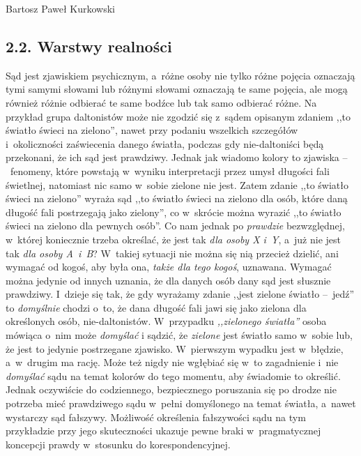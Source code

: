 \begin{artplenv}{Bartosz Paweł Kurkowski}
\subsection{2.2. Warstwy realności}

Sąd jest zjawiskiem psychicznym, a~różne osoby nie tylko różne pojęcia oznaczają tymi samymi słowami lub różnymi słowami
oznaczają te same pojęcia, ale mogą również różnie odbierać te same bodźce lub tak samo odbierać różne. Na przykład
grupa daltonistów może nie zgodzić się z~sądem opisanym zdaniem ,,to światło świeci na zielono'', nawet przy podaniu
wszelkich szczegółów i~okoliczności zaświecenia danego światła, podczas gdy nie-daltoniści będą przekonani, że ich sąd
jest prawdziwy. Jednak jak wiadomo kolory to zjawiska --~fenomeny, które powstają w~wyniku interpretacji przez umysł
długości fali świetlnej, natomiast nic samo w~sobie zielone nie jest. Zatem zdanie ,,to światło świeci na zielono''
wyraża sąd ,,to światło świeci na zielono dla osób, które daną długość fali postrzegają jako zielony'', co w~skrócie
można wyrazić ,,to światło świeci na zielono dla pewnych osób''. Co nam jednak po \textit{prawdzie}
bezwzględnej, w~której koniecznie trzeba określać, że jest
tak \textit{dla osoby X i~Y}, a~już nie jest tak \textit{dla osoby A~i~B}? W~takiej sytuacji nie można się nią
przecież dzielić, ani wymagać od kogoś, aby była ona, \textit{także dla tego kogoś},
uznawana. Wymagać można jedynie od innych uznania, że dla danych osób dany sąd jest słusznie prawdziwy. I~dzieje się
tak, że gdy wyrażamy zdanie ,,jest zielone światło --~jedź'' to \textit{domyślnie }chodzi o~to, że dana długość fali jawi
się jako zielona dla określonych osób, nie-daltonistów. W~przypadku \textit{,,zielonego światła''} osoba mówiąca o~nim
może \textit{domyślać }i sądzić, że \textit{zielone }jest światło samo w~sobie lub, że jest to jedynie postrzegane
zjawisko. W~pierwszym wypadku jest w~błędzie, a~w~drugim ma rację. Może też nigdy nie wgłębiać się w~to
zagadnienie i~nie \textit{domyślać }sądu na temat kolorów do tego momentu, aby świadomie to określić. Jednak oczywiście do
codziennego, bezpiecznego poruszania się po drodze nie potrzeba mieć prawdziwego sądu w~pełni domyślonego na temat
światła, a~nawet wystarczy sąd fałszywy. Możliwość określenia fałszywości sądu na tym przykładzie przy jego
skuteczności ukazuje pewne braki w~pragmatycznej koncepcji prawdy w~stosunku do  korespondencyjnej.



\end{artplenv}
